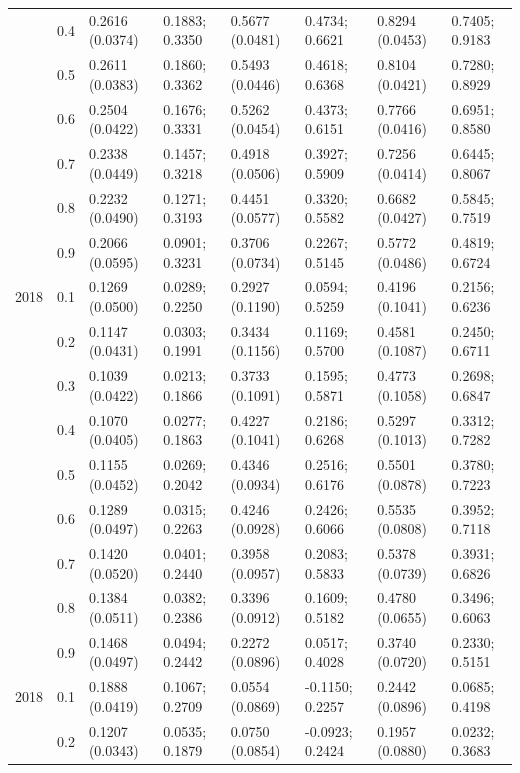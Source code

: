 \begin{table}
{\begin{tabular}[t]{llllllll}
 & 0.4 & 0.2616 (0.0374) & 0.1883; 0.3350 & 0.5677 (0.0481) & 0.4734; 0.6621 & 0.8294 (0.0453) & 0.7405; 0.9183\\
 & 0.5 & 0.2611 (0.0383) & 0.1860; 0.3362 & 0.5493 (0.0446) & 0.4618; 0.6368 & 0.8104 (0.0421) & 0.7280; 0.8929\\
 & 0.6 & 0.2504 (0.0422) & 0.1676; 0.3331 & 0.5262 (0.0454) & 0.4373; 0.6151 & 0.7766 (0.0416) & 0.6951; 0.8580\\
 & 0.7 & 0.2338 (0.0449) & 0.1457; 0.3218 & 0.4918 (0.0506) & 0.3927; 0.5909 & 0.7256 (0.0414) & 0.6445; 0.8067\\
 & 0.8 & 0.2232 (0.0490) & 0.1271; 0.3193 & 0.4451 (0.0577) & 0.3320; 0.5582 & 0.6682 (0.0427) & 0.5845; 0.7519\\
 & 0.9 & 0.2066 (0.0595) & 0.0901; 0.3231 & 0.3706 (0.0734) & 0.2267; 0.5145 & 0.5772 (0.0486) & 0.4819; 0.6724\\
2018 & 0.1 & 0.1269 (0.0500) & 0.0289; 0.2250 & 0.2927 (0.1190) & 0.0594; 0.5259 & 0.4196 (0.1041) & 0.2156; 0.6236\\
 & 0.2 & 0.1147 (0.0431) & 0.0303; 0.1991 & 0.3434 (0.1156) & 0.1169; 0.5700 & 0.4581 (0.1087) & 0.2450; 0.6711\\
 & 0.3 & 0.1039 (0.0422) & 0.0213; 0.1866 & 0.3733 (0.1091) & 0.1595; 0.5871 & 0.4773 (0.1058) & 0.2698; 0.6847\\
 & 0.4 & 0.1070 (0.0405) & 0.0277; 0.1863 & 0.4227 (0.1041) & 0.2186; 0.6268 & 0.5297 (0.1013) & 0.3312; 0.7282\\
 & 0.5 & 0.1155 (0.0452) & 0.0269; 0.2042 & 0.4346 (0.0934) & 0.2516; 0.6176 & 0.5501 (0.0878) & 0.3780; 0.7223\\
 & 0.6 & 0.1289 (0.0497) & 0.0315; 0.2263 & 0.4246 (0.0928) & 0.2426; 0.6066 & 0.5535 (0.0808) & 0.3952; 0.7118\\
 & 0.7 & 0.1420 (0.0520) & 0.0401; 0.2440 & 0.3958 (0.0957) & 0.2083; 0.5833 & 0.5378 (0.0739) & 0.3931; 0.6826\\
 & 0.8 & 0.1384 (0.0511) & 0.0382; 0.2386 & 0.3396 (0.0912) & 0.1609; 0.5182 & 0.4780 (0.0655) & 0.3496; 0.6063\\
 & 0.9 & 0.1468 (0.0497) & 0.0494; 0.2442 & 0.2272 (0.0896) & 0.0517; 0.4028 & 0.3740 (0.0720) & 0.2330; 0.5151\\
2018 & 0.1 & 0.1888 (0.0419) & 0.1067; 0.2709 & 0.0554 (0.0869) & -0.1150; 0.2257 & 0.2442 (0.0896) & 0.0685; 0.4198\\
 & 0.2 & 0.1207 (0.0343) & 0.0535; 0.1879 & 0.0750 (0.0854) & -0.0923; 0.2424 & 0.1957 (0.0880) & 0.0232; 0.3683\\

\end{tabular}}
\end{table}
